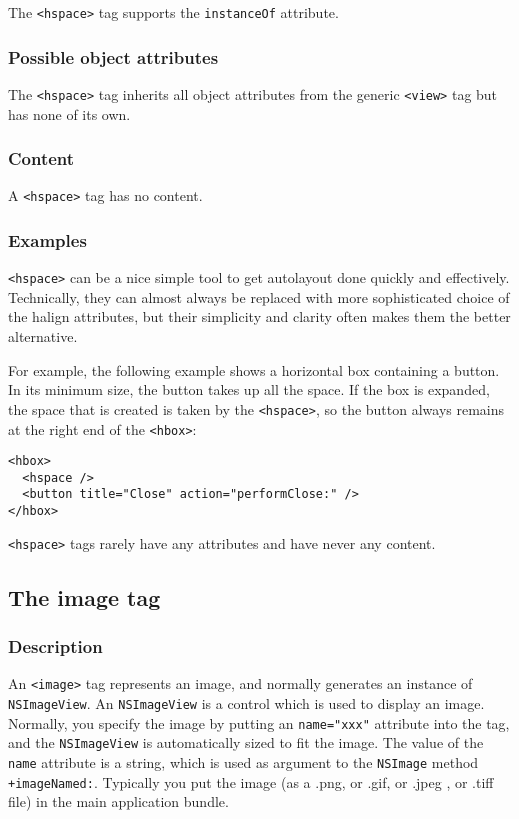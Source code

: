 The \texttt{<hspace>} tag supports the \texttt{instanceOf} attribute.

\subsubsection{Possible object attributes}
The \texttt{<hspace>} tag inherits all object attributes from the
generic \texttt{<view>} tag but has none of its own.

\subsubsection{Content}
A \texttt{<hspace>} tag has no content.

\subsubsection{Examples}
\texttt{<hspace>} can be a nice simple tool to get autolayout done
quickly and effectively.  Technically, they can almost always be
replaced with more sophisticated choice of the halign attributes, but
their simplicity and clarity often makes them the better alternative.

For example, the following example shows a horizontal box containing
a button.  In its minimum size, the button takes up all the space.
If the box is expanded, the space that is created is taken by the
\texttt{<hspace>}, so the button always remains at the right end
of the \texttt{<hbox>}:
\begin{verbatim}
<hbox>
  <hspace />
  <button title="Close" action="performClose:" />
</hbox>
\end{verbatim}

\texttt{<hspace>} tags rarely have any attributes and have never
any content.


\subsection{The image tag}

\subsubsection{Description}
An \texttt{<image>} tag represents an image, and normally generates an
instance of \texttt{NSImageView}.  An \texttt{NSImageView} is a
control which is used to display an image.  Normally, you specify the
image by putting an \texttt{name="xxx"} attribute into the tag, and
the \texttt{NSImageView} is automatically sized to fit the image.  The
value of the \texttt{name} attribute is a string, which is used as
argument to the \texttt{NSImage} method \texttt{+imageNamed:}.
Typically you put the image (as a .png, or .gif, or .jpeg , or .tiff
file) in the main application bundle.

